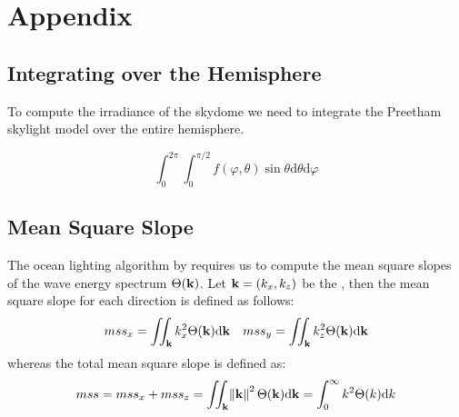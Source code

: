 \chapter{Appendix}
\section{Integrating over the Hemisphere}
To compute the irradiance of the skydome we need to integrate the Preetham skylight
model over the entire hemisphere.

%

\begin{equation}
\int_{0}^{2\pi}\int_{0}^{\pi/2} f(\varphi,\theta) \sin{\theta}\mathrm{d}\theta\mathrm{d}\varphi
\end{equation}
%
%
\section{Mean Square Slope}
%
The ocean lighting algorithm by \cite{misc:oceanlightingfft} requires us to compute
the mean square slopes of the wave energy spectrum $\Theta(\mathbf{k})$.
Let $\mathbf{k} = (k_x, k_z)$ be the \wavevector, then the mean square slope
for each direction is defined as follows:
\begin{align}
mss_x = \iint_{\mathbf{k}} k_x^2 \Theta(\mathbf{k}) \mathrm{d}\mathbf{k} &&
mss_y = \iint_{\mathbf{k}} k_z^2 \Theta(\mathbf{k}) \mathrm{d}\mathbf{k}
\end{align}
%
whereas the total mean square slope is defined as:
\begin{equation}
mss = mss_x + mss_z = \iint_{\mathbf{k}} \norm{\mathbf{k}}^2 \Theta(\mathbf{k}) \mathrm{d}\mathbf{k} = \int_{0}^{\infty}k^2 \Theta(k)\mathrm{d}k
\end{equation}